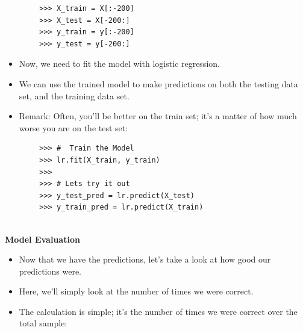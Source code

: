 \documentclass[SKL-MASTER.tex]{subfiles}
\begin{document}
	\begin{framed}
		\begin{verbatim}
		>>> X_train = X[:-200]
		>>> X_test = X[-200:]
		>>> y_train = y[:-200]
		>>> y_test = y[-200:]
		\end{verbatim}
	\end{framed}
	\begin{itemize} 
	\item Now, we need to fit the model with
logistic regression. 
\item We can use the trained model to make predictions on both the testing data set, and the training data set.
\item Remark: Often, you'll be better on the train set; it's a matter of how much worse you are on the test set:
\end{itemize}	
	\begin{framed}
		\begin{verbatim}
		>>> #  Train the Model
		>>> lr.fit(X_train, y_train)
		>>>
		>>> # Lets try it out
		>>> y_test_pred = lr.predict(X_test)
		>>> y_train_pred = lr.predict(X_train)
	
		\end{verbatim}
	\end{framed}
	\newpage
	\noindent \textbf{Model Evaluation}\\
	\begin{itemize}
		\item Now that we have the predictions, let's take a look at how good our predictions were. 
		\item Here,
		we'll simply look at the number of times we were correct.
		\item The calculation is simple; it's the number of times we were correct over the total sample:
	\end{itemize}
	
\end{document}
